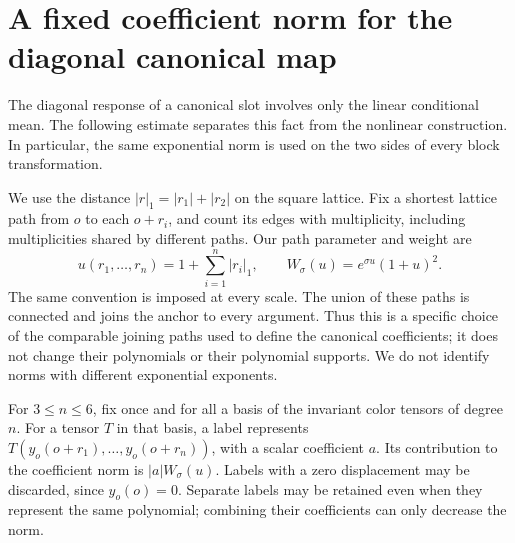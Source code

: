 \section{A fixed coefficient norm for the diagonal canonical map}
\label{supp:canonical-fixed-norm}

The diagonal response of a canonical slot involves only the linear
conditional mean.  The following estimate separates this fact from the
nonlinear construction.  In particular, the same exponential norm is used
on the two sides of every block transformation.

We use the distance $|r|_1=|r_1|+|r_2|$ on the square lattice.  Fix a
shortest lattice path from $o$ to each $o+r_i$, and count its edges with
multiplicity, including multiplicities shared by different paths.  Our
path parameter and weight are
\begin{equation}
 u(r_1,\ldots,r_n)=1+\sum_{i=1}^n|r_i|_1,
 \qquad W_\sigma(u)=e^{\sigma u}(1+u)^2.
 \label{supp:canonical-path}
\end{equation}
The same convention is imposed at every scale.  The union of these paths
is connected and joins the anchor to every argument.  Thus this is a
specific choice of the comparable joining paths used to define the
canonical coefficients; it does not change their polynomials or their
polynomial supports.  We do not identify norms with different exponential
exponents.

For $3\le n\le6$, fix once and for all a basis of the invariant
color tensors of degree $n$.  For a tensor $T$ in that basis, a label represents
$T(y_o(o+r_1),\ldots,y_o(o+r_n))$, with a scalar coefficient $a$.
Its contribution to the coefficient norm is $|a|W_\sigma(u)$.
Labels with a zero displacement may be discarded, since $y_o(o)=0$.
Separate labels may be
retained even when they represent the same polynomial; combining their
coefficients can only decrease the norm.

